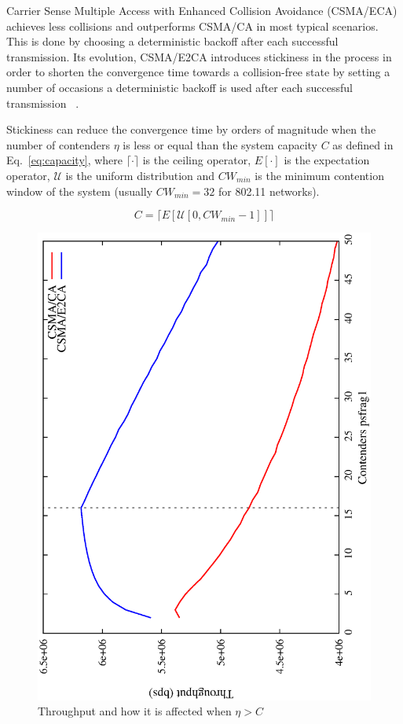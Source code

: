 Carrier Sense Multiple Access with Enhanced Collision Avoidance (CSMA/ECA) achieves less collisions and outperforms CSMA/CA in most typical scenarios. This is done by choosing a deterministic backoff after each successful transmission. Its evolution, CSMA/E2CA introduces stickiness in the process in order to shorten the convergence time towards a collision-free state by setting a number of occasions a deterministic backoff is used after each successful transmission~\cite{CSMA_ECA} .

Stickiness can reduce the convergence time by orders of magnitude when the number of contenders $\eta$ is less or equal than the system capacity $C$ as defined in Eq.~\ref{eq:capacity}, where $\lceil{\cdotp}\rceil$ is the ceiling operator, $E[\cdotp]$ is the expectation operator, $\mathcal{U}$ is the uniform distribution and $CW_{min}$ is the minimum contention window of the system (usually $CW_{min}=32$ for 802.11 networks). 

\begin{equation} \label{eq:capacity}	
	C = \lceil{E[\mathcal{U}[0, CW_{min} - 1]]}\rceil
\end{equation}

\begin{figure}[htbp]
  \centering
  \includegraphics[width=0.7\linewidth, angle = -90]{figures/throughput/throughput.eps}
  \caption{Throughput and how it is affected when $\eta > C$
  \label{fig:throughput}}
\end{figure}

